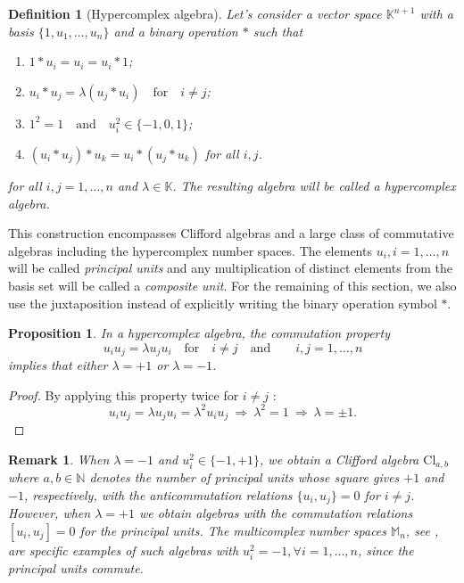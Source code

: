 \documentclass{article}
\newtheorem{definition}[theorem]{Definition}
\newtheorem{proposition}[theorem]{Proposition}
\newtheorem{remark}[theorem]{Remark}
\begin{document}
\begin{definition}[Hypercomplex algebra]
    \label{XOR algebra : hypercomplex algebra def}
    Let's consider a vector space $\mathbb{K}^{n+1}$ with a basis $\{ 1, u_1, \ldots, u_n \}$ and a binary operation $*$ such that
    \begin{enumerate}
        \item $1 * u_i = u_i = u_i * 1$;
        \item $u_i * u_j = \lambda (u_j * u_i) \quad \text{for}\quad i \neq j$;
        \item $1^2 = 1 \quad \text{and} \quad u_i^2 \in \{ -1, 0 ,1 \}$;
        \item $(u_i*u_j)*u_k = u_i*(u_j*u_k)$ for all $i,j$.
    \end{enumerate}
for all $i,j = 1, \ldots, n$ and $\lambda\in \mathbb K$. The resulting algebra will be called a hypercomplex algebra. 
\end{definition}
This construction encompasses Clifford algebras and a large class of commutative algebras including the hypercomplex number spaces. The elements $u_i, i = 1,\ldots, n$ will be called \textit{principal units} and any multiplication of distinct elements from the basis set will be called a \textit{composite unit}. For the remaining of this section, we also use the juxtaposition instead of explicitly writing the binary operation symbol $*$.
\begin{proposition}
    \label{XOR algebra : commutation property lambda values}
    In a hypercomplex algebra, the commutation property 
    $$ u_iu_j = \lambda u_j u_i \quad \text{for}\quad i \neq j \quad \text{and}\quad  \quad i,j = 1, \ldots, n $$
    implies that either $\lambda = +1$ or $\lambda = -1$.
\end{proposition}
\begin{proof}
    By applying this property twice for $i \neq j$ :
    $$ u_i u_j = \lambda u_j u_i = \lambda^2 u_i u_j \ \Rightarrow \ \lambda^2 = 1 \ \Rightarrow \ \lambda = \pm 1. $$
\end{proof}
\begin{remark}
    When $\lambda = -1$ and $u_i^2 \in \{ -1,+1 \}$, we obtain a Clifford algebra $\mathrm{Cl}_{a,b}$ where $a,b \in \mathbb{N}$ denotes the number of principal units whose square gives $+1$ and $-1$, respectively, with the anticommutation relations $\{ u_i, u_j \} = 0$ for $i \neq j$. However, when $\lambda = +1$ we obtain algebras with the commutation relations $[u_i, u_j] = 0$ for the principal units. The multicomplex number spaces $\mathbb M_n$, see \cite{courchesneAndTremblay2025, GBPrice}, are specific examples of such algebras with $u_i^2 = -1, \forall i = 1,\ldots,n$, since the principal units commute.
\end{remark}
\end{document}
